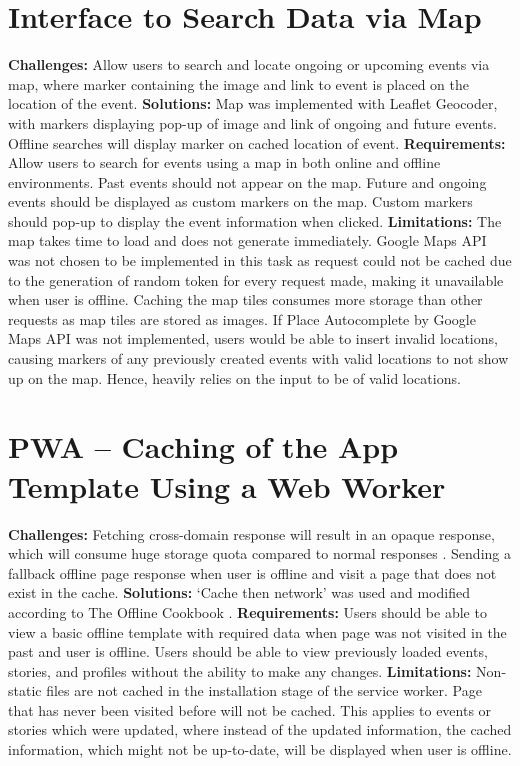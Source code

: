\documentclass[11pt, a4paper]{article}
\begin{document}
\section{Interface to Search Data via Map}
\textbf{Challenges:} Allow users to search and locate ongoing or upcoming events via map, where
marker containing the image and link to event is placed on the location of the event.
\textbf{Solutions:} Map was implemented with Leaflet Geocoder, with markers displaying pop-up of
image and link of ongoing and future events. Offline searches will display marker on cached location
of event. \textbf{Requirements:} Allow users to search for events using a map in both online and
offline environments. Past events should not appear on the map. Future and ongoing events should be
displayed as custom markers on the map. Custom markers should pop-up to display the event
information when clicked. \textbf{Limitations:} The map takes time to load and does not generate
immediately. Google Maps API was not chosen to be implemented in this task as request could not be
cached due to the generation of random token for every request made, making it unavailable when user
is offline. Caching the map tiles consumes more storage than other requests as map tiles are stored
as images. If Place Autocomplete by Google Maps API \cite{google_maps_api} was not implemented,
users would be able to insert invalid locations, causing markers of any previously created events
with valid locations to not show up on the map. Hence, heavily relies on the input to be of valid
locations.

\section{PWA – Caching of the App Template Using a Web Worker}
\textbf{Challenges:} Fetching cross-domain response will result in an opaque response, which will
consume huge storage quota compared to normal responses \cite{opaque_workbox}. Sending a fallback
offline page response when user is offline and visit a page that does not exist in the cache.
\textbf{Solutions:} `Cache then network' was used and modified according to The Offline Cookbook
\cite{offline_cookbook}. \textbf{Requirements:} Users should be able to view a basic offline
template with required data when page was not visited in the past and user is offline. Users should
be able to view previously loaded events, stories, and profiles without the ability to make any
changes. \textbf{Limitations:} Non-static files are not cached in the installation stage
of the service worker. Page that has never been visited before will not be cached. This applies to
events or stories which were updated, where instead of the updated information, the cached
information, which might not be up-to-date, will be displayed when user is offline.
\end{document}
